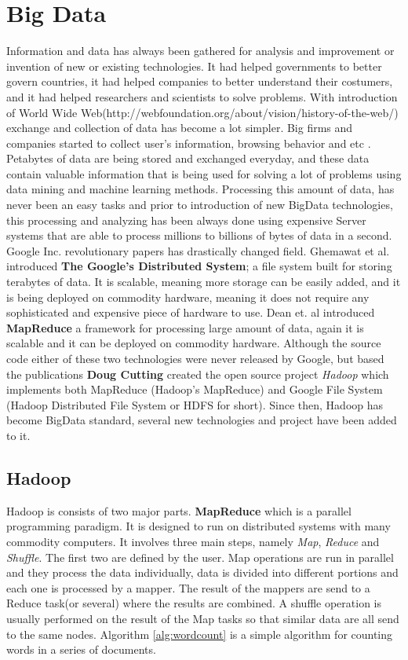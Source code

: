 \documentclass[english]{tktltiki}
\begin{document}
\section{Big Data}
\label{sec:bigdata}
Information and data has always been gathered for analysis and improvement or invention of new or existing technologies. It had helped governments to better govern countries, it had helped companies to better understand their costumers, and it had helped researchers and scientists to solve problems. With introduction of World Wide Web(http://webfoundation.org/about/vision/history-of-the-web/) exchange and collection of data has become a lot simpler. Big firms and companies started to collect user's information, browsing behavior and etc . Petabytes of data are being stored and exchanged everyday, and these data contain valuable information that is being used for solving a lot of problems using data mining and machine learning methods. 
Processing this amount of data, has never been an easy tasks and prior to introduction of new BigData technologies, this processing and analyzing has been always done using expensive Server systems that are able to process millions to billions of bytes of data in a second. 
Google Inc. revolutionary papers has drastically changed field. Ghemawat et al. \cite{ghemawat03} introduced \textbf{The Google's Distributed System}; a file system built for storing terabytes of data. It is scalable, meaning more storage can be easily added, and it is being deployed on commodity hardware, meaning it does not require any sophisticated and expensive piece of hardware to use. Dean et. al \cite{dean04} introduced \textbf{MapReduce} a framework for processing large amount of data, again it is scalable and it can be deployed on commodity hardware. 
Although the source code either of these two technologies were never released by Google, but based the publications \textbf{Doug Cutting} created the open source project \textit{Hadoop} which implements both MapReduce (Hadoop's MapReduce) and Google File System (Hadoop Distributed File System or HDFS for short). Since then, Hadoop has become BigData standard, several new technologies and project have been added to it.

\subsection{Hadoop}
Hadoop is consists of two major parts. 
\textbf{MapReduce} which is a parallel programming paradigm. It is designed to run on distributed systems with many commodity computers. It involves three main steps, namely \textit{Map}, \textit{Reduce} and \textit{Shuffle}. The first two are defined by the user. Map operations are run in parallel and they process the data individually, data is divided into different portions and each one is processed by a mapper. The result of the mappers are send to a Reduce task(or several) where the results are combined. A shuffle operation is usually performed on the result of the Map tasks so that similar data are all send to the same nodes. Algorithm \ref{alg:wordcount} is a simple algorithm for counting words in a series of documents. 
\end{document}
